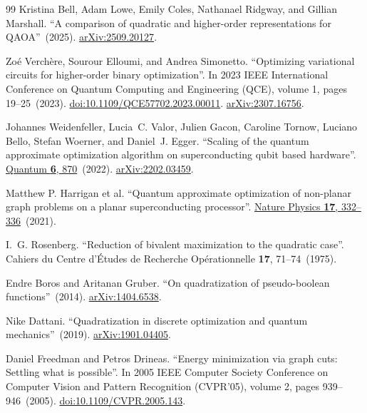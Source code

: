 \documentclass[a4paper,onecolumn,11pt,unpublished]{quantumarticle}
\theoremstyle{remark}
\begin{document}
\begin{thebibliography}{99}
Kristina Bell, Adam Lowe, Emily Coles, Nathanael Ridgway, and Gillian Marshall.
\newblock ``A comparison of quadratic and higher-order representations for QAOA''~(2025).
\newblock \href{http://arxiv.org/abs/2509.20127}{arXiv:2509.20127}.

Zo{\'e} Verch{\`e}re, Sourour Elloumi, and Andrea Simonetto.
\newblock ``Optimizing variational circuits for higher-order binary optimization''.
\newblock In 2023 IEEE International Conference on Quantum Computing and Engineering (QCE), volume 1, pages 19--25~(2023).
\newblock \href{https://dx.doi.org/10.1109/QCE57702.2023.00011}{doi:10.1109/QCE57702.2023.00011}.
\newblock \href{http://arxiv.org/abs/2307.16756}{arXiv:2307.16756}.

Johannes Weidenfeller, Lucia~C. Valor, Julien Gacon, Caroline Tornow, Luciano Bello, Stefan Woerner, and Daniel~J. Egger.
\newblock ``Scaling of the quantum approximate optimization algorithm on superconducting qubit based hardware''.
\newblock \href{https://dx.doi.org/10.22331/q-2022-12-07-870}{Quantum {\bf 6}, 870}~(2022).
\newblock \href{http://arxiv.org/abs/2202.03459}{arXiv:2202.03459}.

Matthew P. Harrigan et al.
\newblock ``Quantum approximate optimization of non-planar graph problems on a planar superconducting processor''.
\newblock \href{https://doi.org/10.1038/s41567-020-01105-y}{Nature Physics {\bf 17}, 332--336}~(2021).

I.~G. Rosenberg.
\newblock ``Reduction of bivalent maximization to the quadratic case''.
\newblock Cahiers du Centre d'\'Etudes de Recherche Op\'erationnelle {\bf 17}, 71--74~(1975).

Endre Boros and Aritanan Gruber.
\newblock ``On quadratization of pseudo-boolean functions''~(2014).
\newblock \href{http://arxiv.org/abs/1404.6538}{arXiv:1404.6538}.

Nike Dattani.
\newblock ``Quadratization in discrete optimization and quantum mechanics''~(2019).
\newblock \href{http://arxiv.org/abs/1901.04405}{arXiv:1901.04405}.

Daniel Freedman and Petros Drineas.
\newblock ``Energy minimization via graph cuts: Settling what is possible''.
\newblock In 2005 IEEE Computer Society Conference on Computer Vision and Pattern Recognition (CVPR'05), volume 2, pages 939--946~(2005).
\newblock \href{https://dx.doi.org/10.1109/CVPR.2005.143}{doi:10.1109/CVPR.2005.143}.


\end{thebibliography}
\end{document}
